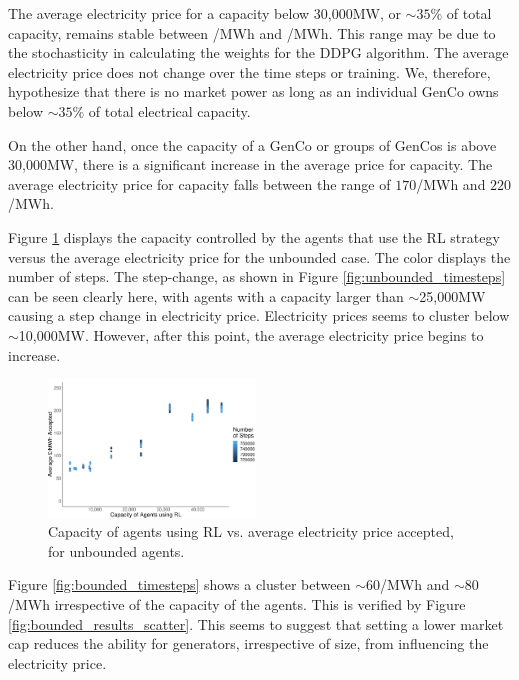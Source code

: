 \documentclass[conference]{IEEEtran}
\begin{document}
The average electricity price for a capacity below 30,000MW, or ${\sim35\%}$ of total capacity, remains stable between /MWh and /MWh. This range may be due to the stochasticity in calculating the weights for the DDPG algorithm. The average electricity price does not change over the time steps or training. We, therefore, hypothesize that there is no market power as long as an individual GenCo owns below ${\sim}35\%$ of total electrical capacity. 

On the other hand, once the capacity of a GenCo or groups of GenCos is above 30,000MW, there is a significant increase in the average price for capacity. The average electricity price for capacity falls between the range of  \textsterling$170$/MWh and \textsterling$220$/MWh. 

Figure \ref{fig:unbounded_results_scatter} displays the capacity controlled by the agents that use the RL strategy versus the average electricity price for the unbounded case. The color displays the number of steps. The step-change, as shown in Figure \ref{fig:unbounded_timesteps} can be seen clearly here, with agents with a capacity larger than ${\sim}$25,000MW causing a step change in electricity price. Electricity prices seems to cluster below ${\sim}$10,000MW. However, after this point, the average electricity price begins to increase.



\begin{figure}[]
	\centering
    \includegraphics[width=0.49\textwidth]{figures/results/unbounded_results_scatter.pdf}
    \caption{Capacity of agents using RL vs. average electricity price accepted, for unbounded agents.}
    \label{fig:unbounded_results_scatter}
\end{figure}


Figure \ref{fig:bounded_timesteps} shows a cluster between ${\sim}$\textsterling$60$/MWh and ${\sim}$\textsterling$80$/MWh irrespective of the capacity of the agents. This is verified by Figure \ref{fig:bounded_results_scatter}. This seems to suggest that setting a lower market cap reduces the ability for generators, irrespective of size, from influencing the electricity price.
\end{document}
